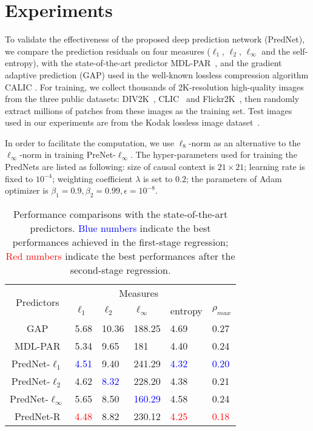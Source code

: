 \documentclass{article}
\begin{document}
\section{Experiments}
To validate the effectiveness of the proposed deep prediction network (PredNet), we compare the prediction residuals on four measures ($\ell_1$, $\ell_2$, $\ell_\infty$ and the self-entropy), with the state-of-the-art predictor MDL-PAR~\cite{MDL-PAR}, and the gradient adaptive prediction (GAP) used in the well-known lossless compression algorithm CALIC \cite{CALIC}.
For training, we collect thousands of 2K-resolution high-quality images from the three public datasets: DIV2K~\cite{DIV2K}, CLIC~\cite{CLIC} and Flickr2K~\cite{Flickr2K}, then randomly extract millions of patches from these images as the training set.
Test images used in our experiments are from the Kodak lossless image dataset~\cite{kodak}.

In order to facilitate the computation, we use $\ell_8$-norm as an alternative to the $\ell_\infty$-norm in training PreNet-$\ell_\infty$.
The hyper-parameters used for training the PredNets are listed as following: size of causal context is $21 \times 21$; learning rate is fixed to $10^{-4}$; weighting coefficient $\lambda$ is set to $0.2$; the parameters of Adam optimizer is $\beta_1=0.9, \beta_2=0.99, \epsilon=10^{-8}$.

\begin{table}[!ht]
\centering
\caption{Performance comparisons with the state-of-the-art predictors. \textcolor{blue}{Blue numbers} indicate the best performances achieved in the first-stage regression; \textcolor{red}{Red numbers} indicate the best performances after the second-stage regression.}
\centering
\label{tab:self-ent}
\renewcommand\arraystretch{1.3}
\vskip 0.2cm
\begin{tabular}{c|p{0.8cm}<{\centering}p{0.8cm}<{\centering}p{0.8cm}<{\centering}p{0.8cm}<{\centering}p{0.8cm}<{\centering}}
\hline
\multirow{2}{*}{Predictors} & \multicolumn{4}{c}{Measures} \\
	& $\ell_1$ & $\ell_2$ & $\ell_\infty$ & entropy & $\rho_{max}$ \\
\hline
GAP  & 5.68 & 10.36 & 188.25 & 4.69 & 0.27 \\
MDL-PAR  & 5.34 & 9.65 & 181 & 4.40 & 0.24\\
\hline
PredNet-$\ell_1$ & \textcolor{blue}{4.51} & 9.40 & 241.29 & \textcolor{blue}{4.32} & \textcolor{blue}{0.20} \\
PredNet-$\ell_2$ & 4.62 & \textcolor{blue}{8.32} & 228.20 & 4.38 & 0.21 \\
PredNet-$\ell_\infty$ & 5.65 & {8.50} & \textcolor{blue}{160.29} & 4.58 & 0.24 \\
\hline
PredNet-R & \textcolor{red}{4.48} & 8.82 & 230.12 & \textcolor{red}{4.25} & \textcolor{red}{0.18}\\
\hline
\end{tabular}
\end{table}
\end{document}

